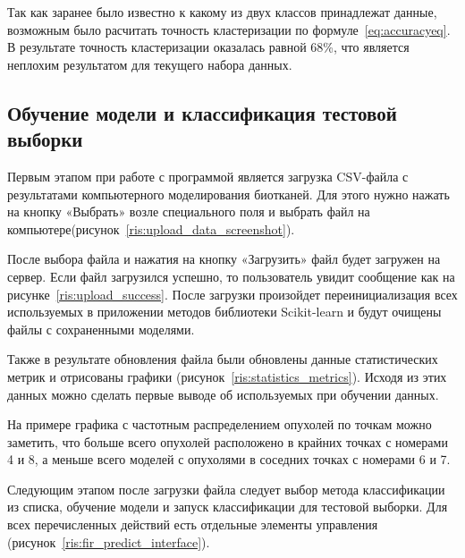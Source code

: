 Так как заранее было известно к какому из двух классов принадлежат данные, возможным было расчитать точность кластеризации по формуле~\eqref{eq:accuracyeq}. В результате точность кластеризации оказалась равной 68\%, что является неплохим результатом для текущего набора данных.

\subsection{Обучение модели и классификация тестовой выборки}
Первым этапом при работе с программой является загрузка CSV-файла с результатами компьютерного моделирования биотканей. Для этого нужно нажать на кнопку «Выбрать» возле специального поля и выбрать файл на компьютере(рисунок~\ref{ris:upload_data_screenshot}).
\par
После выбора файла и нажатия на кнопку «Загрузить» файл будет загружен на сервер. Если файл загрузился успешно, то пользователь увидит сообщение как на рисунке~\ref{ris:upload_success}. После загрузки произойдет переинициализация всех используемых в приложении методов библиотеки Scikit-learn и будут очищены файлы с сохраненными моделями.
\par
Также в результате обновления файла были обновлены данные статистических метрик и отрисованы графики (рисунок~\ref{ris:statistics_metrics}). Исходя из этих данных можно сделать первые выводе об используемых при обучении данных. 
\par
На примере графика с частотным распределением опухолей по точкам можно заметить, что больше всего опухолей расположено в крайних точках с номерами 4 и 8, а меньше всего моделей с опухолями в соседних точках с номерами 6 и 7.
\par
Следующим этапом после загрузки файла следует выбор метода классификации из списка, обучение модели и запуск классификации для тестовой выборки. Для всех перечисленных действий есть отдельные элементы управления (рисунок~\ref{ris:fir_predict_interface}). 

